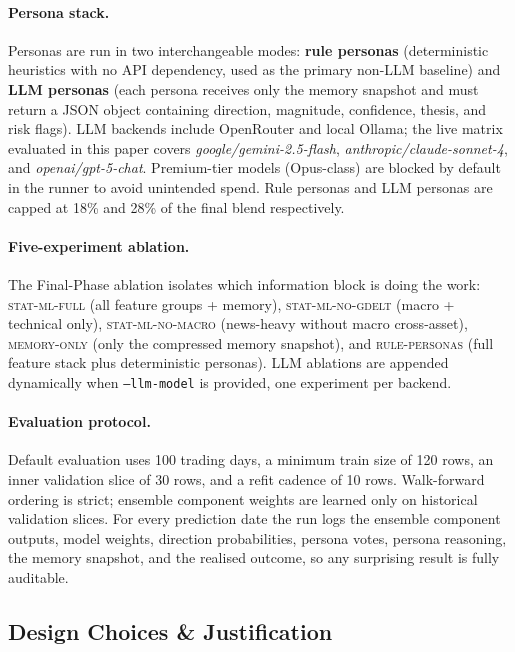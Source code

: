 \documentclass[11pt]{article}
\begin{document}
\paragraph{Persona stack.}
Personas are run in two interchangeable modes: \textbf{rule personas} (deterministic heuristics with no API dependency, used as the primary non-LLM baseline) and \textbf{LLM personas} (each persona receives only the memory snapshot and must return a JSON object containing direction, magnitude, confidence, thesis, and risk flags). LLM backends include OpenRouter and local Ollama; the live matrix evaluated in this paper covers \textit{google/gemini-2.5-flash}, \textit{anthropic/claude-sonnet-4}, and \textit{openai/gpt-5-chat}. Premium-tier models (Opus-class) are blocked by default in the runner to avoid unintended spend. Rule personas and LLM personas are capped at 18\% and 28\% of the final blend respectively.

\paragraph{Five-experiment ablation.}
The Final-Phase ablation isolates which information block is doing the work: \textsc{stat-ml-full} (all feature groups + memory), \textsc{stat-ml-no-gdelt} (macro + technical only), \textsc{stat-ml-no-macro} (news-heavy without macro cross-asset), \textsc{memory-only} (only the compressed memory snapshot), and \textsc{rule-personas} (full feature stack plus deterministic personas). LLM ablations are appended dynamically when \texttt{--llm-model} is provided, one experiment per backend.

\paragraph{Evaluation protocol.}
Default evaluation uses 100 trading days, a minimum train size of 120 rows, an inner validation slice of 30 rows, and a refit cadence of 10 rows. Walk-forward ordering is strict; ensemble component weights are learned only on historical validation slices. For every prediction date the run logs the ensemble component outputs, model weights, direction probabilities, persona votes, persona reasoning, the memory snapshot, and the realised outcome, so any surprising result is fully auditable.

\subsection{Design Choices \& Justification}
\end{document}
